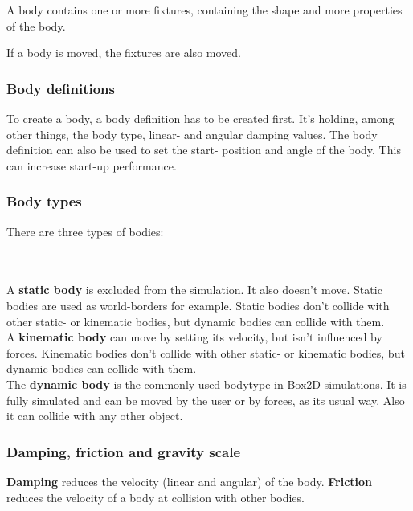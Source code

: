 \documentclass[10pt,a4paper,DIV=11]{scrreprt}
\begin{document}
A body contains one or more fixtures, containing the shape and more properties of the body.

If a body is moved, the fixtures are also moved.

\subsubsection*{Body definitions}
To create a body, a body definition has to be created first. It's holding, among other things, the body type, linear- and angular damping values.
The body definition can also be used to set the start- position and angle of the body. This can increase start-up performance.

\subsubsection*{Body types}
There are three types of bodies:

   \\
\\

A \textbf{static body} is excluded from the simulation. It also doesn't move. Static bodies are used as world-borders for example. Static bodies don't collide with other static- or kinematic bodies, but dynamic bodies can collide with them. \\

A \textbf{kinematic body} can move by setting its velocity, but isn't influenced by forces.
Kinematic bodies don't collide with other static- or kinematic bodies, but dynamic bodies can collide with them.\\

The \textbf{dynamic body} is the commonly used bodytype in Box2D-simulations. It is fully simulated and can be moved by the user or by forces, as its usual way. Also it can collide with any other object.

\subsubsection*{Damping, friction and gravity scale}
\textbf{Damping} reduces the velocity (linear and angular) of the body.
\textbf{Friction} reduces the velocity of a body at collision with other bodies.
\end{document}
